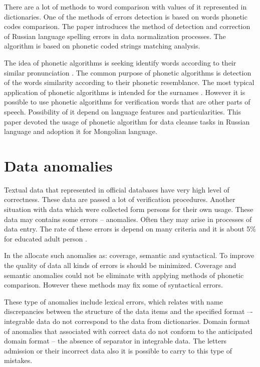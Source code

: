 \documentclass[conference,a4paper]{IEEEtran}
\begin{document}
There are a lot of methods to word comparison with values of it represented in dictionaries. One of the methods of errors detection is based on words phonetic codes comparison. The paper introduces the method of detection and correction of Russian language spelling errors in data normalization processes. The algorithm is based on phonetic coded strings matching analysis.

The idea of phonetic algorithms is seeking identify words according to their similar pronunciation \cite{Parmar-2014}. The common purpose of phonetic algorithms is detection of the words similarity according to their phonetic resemblance. The most typical application of phonetic algorithms is intended for the surnames \cite{Zahoransky-2015}. However it is possible to use phonetic algorithms for verification words that are other parts of speech. Possibility of it depend on language features and particularities. This paper devoted the usage of phonetic algorithm for data cleanse tasks in Russian language and adoption it for Mongolian language.

\section{Data anomalies}
Textual data that represented in official databases have very high level of correctness. These data are passed a lot of verification procedures. Another situation with data which were collected form persons for their own usage. These data may contains some errors – anomalies. Often they may arise in processes of data entry. The rate of these errors is depend on many criteria and it is about 5\% for educated adult person \cite{Orr-1998}.

In the \cite{Osipov-2002} allocate such anomalies as: coverage, semantic and syntactical. To improve the quality of data all kinds of errors is should be minimized. Coverage and semantic anomalies could not be eliminate with applying methods of phonetic comparison. However these methods may fix some of syntactical errors.

These type of anomalies include lexical errors, which relates with name discrepancies between the structure of the data items and the specified format –- integrable data do not correspond to the data from dictionaries.  Domain format of anomalies that associated with correct data do not conform to the anticipated domain format – the absence of separator in integrable data. The letters admission or their incorrect data also it is possible to carry to this type of mistakes.
\end{document}
